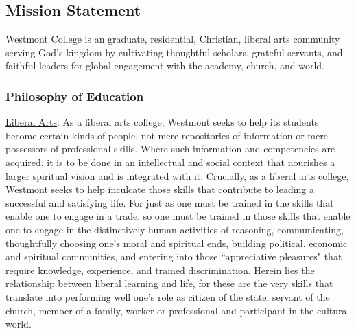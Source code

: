 \subsection{Mission Statement}
   Westmont College is an graduate, residential, Christian, liberal arts community serving God's kingdom by cultivating thoughtful scholars, grateful servants, and faithful leaders for global engagement with the academy, church, and world.
\subsubsection{Philosophy of Education}

\underline {Liberal Arts}: As a liberal arts college, Westmont seeks to help its students become certain kinds of people, not mere repositories of information or mere possessors of professional skills.  Where such information and competencies are acquired, it is to be done in an intellectual and social context that nourishes a larger spiritual vision and is integrated with it.  Crucially, as a liberal arts college, Westmont seeks to help inculcate those skills that contribute to leading a successful and satisfying life.  For just as one must be trained in the skills that enable one to engage in a trade, so one must be trained in those skills that enable one to engage in the distinctively human activities of reasoning, communicating, thoughtfully choosing one's moral and spiritual ends, building political, economic and spiritual communities, and entering into those ``appreciative pleasures" that require knowledge, experience, and trained discrimination. Herein lies the relationship between liberal learning and life, for these are the very skills that translate into performing well one's role as citizen of the state, servant of the church, member of a family, worker or professional and participant in the cultural world.


